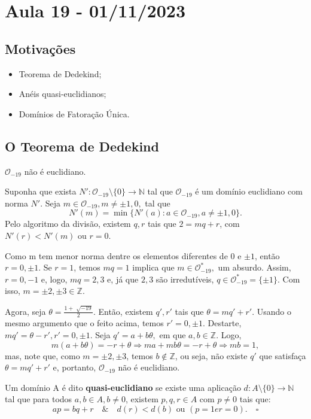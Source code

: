 \documentclass[AlgebraII/algebraII_notes.tex]{subfiles}
\begin{document}
\section{Aula 19 - 01/11/2023}
\subsection{Motivações}
\begin{itemize}
	\item Teorema de Dedekind;
	\item Anéis quasi-euclidianos;
	\item Domínios de Fatoração Única.
\end{itemize}
\subsection{O Teorema de Dedekind}
\begin{theorem*}
	\(\mathcal{O}_{-19}\) não é euclidiano.
\end{theorem*}
\begin{proof*}
	Suponha que exista \(N':\mathcal{O}_{-19}\setminus{\{0\}}\rightarrow \mathbb{N}\) tal que \(\mathcal{O}_{-19}\) é um domínio euclidiano com norma \(N'.\) Seja \(m\in \mathcal{O}_{-19}, m\neq \pm1, 0,\)
	tal que
	\[
		N'(m) = \min\{N'(a): a\in \mathcal{O}_{-19}, a\neq \pm1, 0\}.
	\]
	Pelo algoritmo da divisão, existem \(q, r\) tais que \(2 = mq + r\), com \(N'(r) < N'(m)\)
	ou \(r=0\).

	Como m tem menor norma dentre os elementos diferentes de \(0\) e \(\pm 1\), então \(r=0, \pm1\). Se \(r=1\), temos
	\(mq = 1\) implica que \(m\in \mathcal{O}_{-19}^{*},\) um absurdo. Assim, \(r=0, -1\) e,
	logo, \(mq = 2, 3\) e, já que \(2, 3\) são irredutíveis, \(q\in \mathcal{O}_{-19}^{*} = \{\pm1\}.\) Com isso,
	\(m=\pm2, \pm 3\in \mathbb{Z}.\)

	Agora, seja \(\theta = \frac{1 + \sqrt[]{-19}}{2}.\) Então, existem \(q', r'\) tais que \(\theta  = mq'+r'.\) Usando o mesmo
	argumento que o feito acima, temos \(r'=0, \pm1.\) Destarte, \(mq'=\theta - r', r'=0, \pm1.\) Seja \(q'= a + b\theta ,\)
	em que \(a, b\in \mathbb{Z}.\) Logo,
	\[
		m(a + b\theta ) = -r + \theta  \Rightarrow ma + mb\theta = -r + \theta  \Rightarrow mb = 1,
	\]
	mas, note que, como \(m = \pm2, \pm3\), temos \(b\not\in \mathbb{Z}\), ou seja, não existe \(q'\) que satisfaça \(\theta  = mq' + r'\) e, portanto,
	\(\mathcal{O}_{-19}\) não é euclidiano. \qedsymbol
\end{proof*}
\begin{def*}
	Um domínio A é dito \textbf{quasi-euclidiano} se existe uma aplicação \(d:A\setminus{\{0\}}\rightarrow \mathbb{N}\) tal que para todos \(a, b\in A, b\neq0\),
	existem \(p, q, r\in A\) com \(p\neq0\) tais que:
	\[
		ap = bq + r\quad\&\quad d(r) < d(b) \text{ ou } (p=1 e r=0).\quad\square
	\]
\end{def*}
\end{document}
